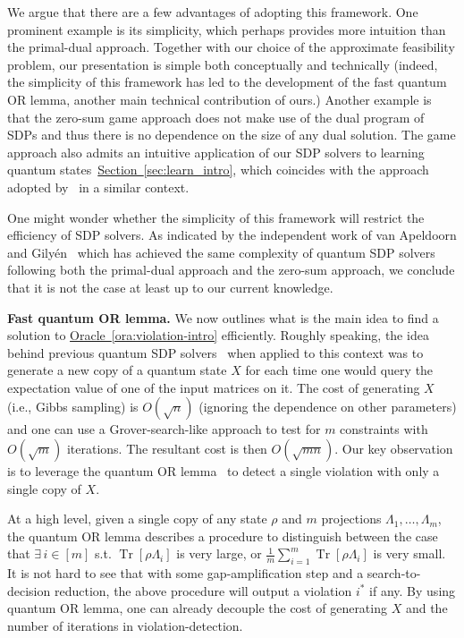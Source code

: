 \documentclass[a4paper,UKenglish,cleveref, autoref]{lipics-v2019}
\theoremstyle{remark}
\numberwithin{equation}{section}
\numberwithin{oracle}{section}
\numberwithin{remark}{section}
\newcommand{\ora}[1]{\hyperref[ora:#1]{Oracle~\ref*{ora:#1}}}
\renewcommand{\sec}[1]{\hyperref[sec:#1]{Section~\ref*{sec:#1}}}
\newcommand{\range}[1]{[#1]}
\DeclareMathOperator{\Tr}{Tr}
\newcommand{\hd}[1]{\vspace{2mm} \noindent \textbf{#1}}
\begin{document}
We argue that there are a few advantages of adopting this framework. One prominent example is its simplicity, which perhaps provides more intuition than the primal-dual approach. Together with our choice of the approximate feasibility problem, our presentation is simple both conceptually and technically (indeed, the simplicity of this framework has led to the development of the fast quantum OR lemma, another main technical contribution of ours.) Another example is that the zero-sum game approach does not make use of the dual program of SDPs and thus there is no dependence on the size of any dual solution. The game approach also admits an intuitive application of our SDP solvers to learning quantum states~\sec{learn_intro}, which coincides with the approach adopted by~\cite{LRS15} in a similar context.

One might wonder whether the simplicity of this framework will restrict the efficiency of SDP solvers. As indicated by the independent work of van Apeldoorn and Gily{\'e}n~\cite{vAG18} which has achieved the same complexity of quantum SDP solvers following both the primal-dual approach and the zero-sum approach, we conclude that it is not the case at least up to our current knowledge.

\hd{Fast quantum OR lemma.} We now outlines what is the main idea to find  a solution to \ora{violation-intro} efficiently. Roughly speaking, the idea behind previous quantum SDP solvers~\cite{brandao2016quantum, vanApeldoorn2017quantum} when applied to this context was to generate a new copy of a quantum state $X$ for each time one would query the expectation value of one of the input matrices on it. The cost of generating $X$ (i.e., Gibbs sampling) is $O(\sqrt{n})$ (ignoring the dependence on other parameters) and one can use a Grover-search-like approach to test for $m$ constraints with $O(\sqrt{m})$ iterations. The resultant cost is then $O(\sqrt{mn})$. Our key observation is to leverage the quantum OR lemma~\cite{harrow2017sequential} to detect a single violation with only a single copy of $X$.

At a high level, given a single copy of any state $\rho$ and $m$ projections $\Lambda_1, \ldots, \Lambda_m$, the quantum OR lemma describes a procedure to distinguish between the case that $\exists\,i\in\range{m}$ s.t. $\Tr[\rho\Lambda_{i}]$ is very large, or $\frac{1}{m}\sum_{i=1}^{m}\Tr[\rho\Lambda_{i}]$ is very small.
It is not hard to see that with some gap-amplification step and a search-to-decision reduction, the above procedure will output a violation $i^*$ if any.
By using quantum OR lemma, one can already decouple the cost of generating $X$ and the number of iterations in violation-detection.
\end{document}
